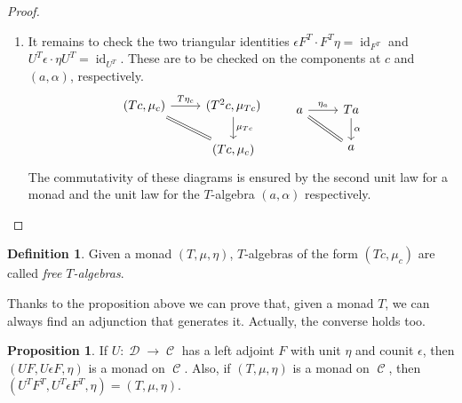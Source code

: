 \documentclass[a4paper,11pt,oneside,openany]{scrbook}
\DeclareMathOperator{\C}{\mathcal{C}}
\DeclareMathOperator{\D}{\mathcal{D}}
\DeclareMathOperator{\id}{id}
\theoremstyle{definition}
\theoremstyle{definition}
\newtheorem{defn}[thm]{Definition} %
\newtheorem{prop}[thm]{Proposition}
\begin{document}
\begin{proof}
\begin{enumerate}[label=(\roman*)]
	\item It remains to check the two triangular identities $\epsilon F^T \cdot F^T\eta=\id_{F^T}$ and $U^T\epsilon\cdot\eta U^T=\id_{U^T}$. These are to be checked on the components at $c$ and $(a, \alpha)$, respectively.
	\[
		\begin{tikzcd}
	(Tc,\mu_c)\ar["T\eta_{c}",rightarrow]{r}\ar[equal]{dr}
	& (T^2c,\mu_{Tc})\ar["\mu_{Tc}", rightarrow]{d}
	\\
	& (Tc,\mu_c)
	\end{tikzcd}	\quad\quad
	\begin{tikzcd}
	a\ar["\eta_a",rightarrow]{r}\ar[equal]{dr}
	& Ta\ar["\alpha", rightarrow]{d}
	\\
	& a
	\end{tikzcd}
	\]
	The commutativity of these diagrams is ensured by the second unit law for a monad and the unit law for the $T$-algebra $(a,\alpha)$ respectively. \qedhere
	\end{enumerate}
\end{proof}
\begin{defn}
Given a monad $(T,\mu,\eta)$, $T$-algebras of the form $(Tc, \mu_c)$ are called \emph{free $T$-algebras}.
\end{defn}
Thanks to the proposition above we can prove that, given a monad $T$, we can always find an adjunction that generates it. Actually, the converse holds too.
\begin{prop}
If $U\colon\D\to\C$ has a left adjoint $F$ with unit $\eta$ and counit $\epsilon$, then $(UF,U\epsilon F,\eta)$ is a monad on $\C$. Also, if $(T,\mu,\eta)$ is a monad on $\C$, then $(U^TF^T,U^T\epsilon F^T,\eta)=(T,\mu,\eta)$. 
\end{prop}
\end{document}
